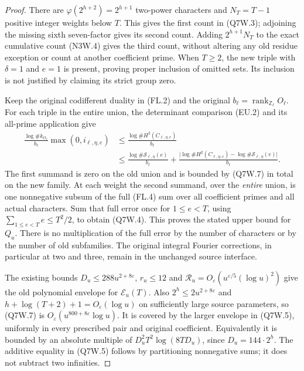 \begin{proof}
There are $\varphi(2^{h+2})=2^{h+1}$ two-power characters and
$N_T=T-1$ positive integer weights below $T$.
This gives the first count in (Q7W.3); adjoining the missing
sixth seven-factor gives its second count.
Adding $2^{h+1}N_T$ to the exact cumulative count (N3W.4)
gives the third count, without altering any old residue exception
or count at another coefficient prime.
When $T\geq2$, the new triple with $\delta=1$ and $e=1$ is
present, proving proper inclusion of omitted sets.
Its inclusion is not justified by claiming its strict group zero.

Keep the original codifferent duality in (FL.2) and the original
$b_\ell=\operatorname{rank}_{\mathbb Z_\ell}O_\ell$.
For each triple in the entire union, the determinant comparison
(EU.2) and its all-prime application give
\[
 \begin{aligned}
 \frac{\log\#k_{O_\ell}}{b_\ell}\max(0,i_{\ell,\eta,e})
 &\leq \frac{\log\#H^2(C_{\ell,\eta,e})}{b_\ell}\\
 &\leq\frac{\log\#\mathcal S_{\ell,\eta}(e)}{b_\ell}
   +\frac{\bigl|\log\#H^2(C_{\ell,\eta,e})
                 -\log\#\mathcal S_{\ell,\eta}(e)\bigr|}{b_\ell}.
 \end{aligned}\tag{Q7W.8}
\]
The first summand is zero on the old union and is bounded by
(Q7W.7) in total on the new family.
At each weight the second summand, over the \emph{entire} union,
is one nonnegative subsum of the full (FL.4) sum over all
coefficient primes and all actual characters.
Sum that full error once for $1\leq e<T$, using
$\sum_{1\leq e<T}e\leq T^2/2$, to obtain (Q7W.4).
This proves the stated upper bound for $Q_u$.
There is no multiplication of the full error by the number of
characters or by the number of old subfamilies.
The original integral Fourier corrections, in particular at
two and three, remain in the unchanged source interface.

The existing bounds $D_u\leq288u^{2+8\varepsilon}$,
$r_u\leq12$ and
$\mathcal R_u=O_\varepsilon(u^{\varepsilon/5}(\log u)^2)$
give the old polynomial envelope for $\mathcal E_u(T)$.
Also $2^h\leq2u^{2+8\varepsilon}$ and
$h+\log(T+2)+1=O_\varepsilon(\log u)$ on sufficiently large
source parameters, so (Q7W.7) is
$O_\varepsilon(u^{800+8\varepsilon}\log u)$.
It is covered by the larger envelope in (Q7W.5), uniformly
in every prescribed pair and original coefficient.
Equivalently it is bounded by an absolute multiple of
$D_u^2T^2\log(8TD_u)$, since $D_u=144\cdot2^h$.
The additive equality in (Q7W.5) follows by partitioning
nonnegative sums; it does not subtract two infinities.


\end{proof}
